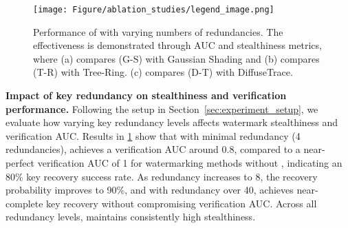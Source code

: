 \begin{figure}[t]
    \centering
    \begin{minipage}{\linewidth}
        \centering
        \texttt{[image: Figure/ablation\_studies/legend\_image.png]} %
        \vspace{-0.3cm} 
    \end{minipage}
    
     \vspace{-0.3cm}
    \caption{Performance of \tool with varying numbers of redundancies. The effectiveness is demonstrated through AUC and stealthiness metrics, where (a) compares \tool(G-S) with Gaussian Shading and (b) compares \tool(T-R) with Tree-Ring. (c) compares \tool(D-T) with DiffuseTrace.}
    \label{fig:redundancy}
    \vspace{-0.3cm}
\end{figure}

\noindent
\textbf{Impact of key redundancy on stealthiness and verification performance.} 
Following the setup in Section~\ref{sec:experiment_setup}, we evaluate how varying key redundancy levels affects watermark stealthiness and verification AUC. Results in \cref{fig:redundancy} show that with minimal redundancy (4 redundancies), \tool achieves a verification AUC around 0.8, compared to a near-perfect verification AUC of 1 for watermarking methods without \tool, indicating an 80\% key recovery success rate. As redundancy increases to 8, the recovery probability improves to 90\%, and with redundancy over 40, \tool achieves near-complete key recovery without compromising verification AUC.  Across all redundancy levels, \tool maintains consistently high stealthiness.

